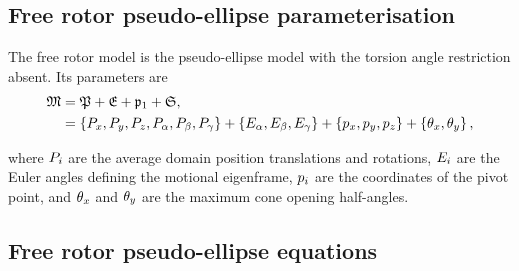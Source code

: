\subsection{Free rotor pseudo-ellipse parameterisation}

The free rotor model is the pseudo-ellipse model with the torsion angle restriction absent.
Its parameters are
\begin{subequations}
\begin{align}
    \mathfrak{M} &= \mathfrak{P} + \mathfrak{E} + \mathfrak{p}_1 + \mathfrak{S}, \\
              &= \left\{ P_x, P_y, P_z, P_\alpha, P_\beta, P_\gamma \right\} + \left\{ E_\alpha, E_\beta, E_\gamma \right\} + \left\{ p_x, p_y, p_z \right\} + \left\{ \theta_x, \theta_y \right\} ,
\end{align}
\end{subequations}

where $P_i$ are the average domain position translations and rotations, $E_i$ are the Euler angles defining the motional eigenframe, $p_i$ are the coordinates of the pivot point, and $\theta_x$ and $\theta_y$ are the maximum cone opening half-angles.


\subsection{Free rotor pseudo-ellipse equations}

